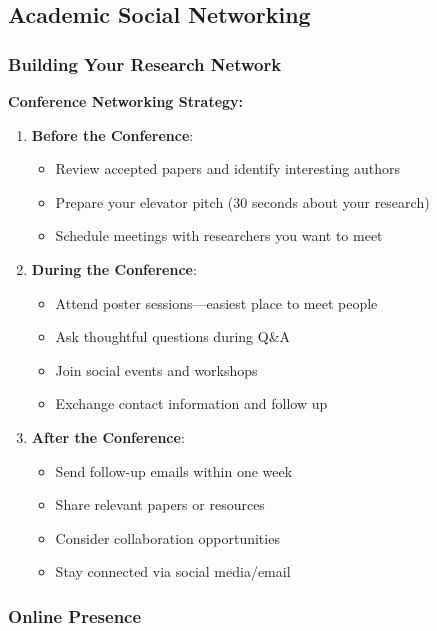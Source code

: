 \documentclass[11pt,a4paper]{article}
\begin{document}
\subsection{Academic Social Networking}

\subsubsection{Building Your Research Network}

\textbf{Conference Networking Strategy:}
\begin{enumerate}
    \item \textbf{Before the Conference}:
    \begin{itemize}
        \item Review accepted papers and identify interesting authors
        \item Prepare your elevator pitch (30 seconds about your research)
        \item Schedule meetings with researchers you want to meet
    \end{itemize}
    
    \item \textbf{During the Conference}:
    \begin{itemize}
        \item Attend poster sessions—easiest place to meet people
        \item Ask thoughtful questions during Q\&A
        \item Join social events and workshops
        \item Exchange contact information and follow up
    \end{itemize}
    
    \item \textbf{After the Conference}:
    \begin{itemize}
        \item Send follow-up emails within one week
        \item Share relevant papers or resources
        \item Consider collaboration opportunities
        \item Stay connected via social media/email
    \end{itemize}
\end{enumerate}

\subsubsection{Online Presence}
\end{document}
